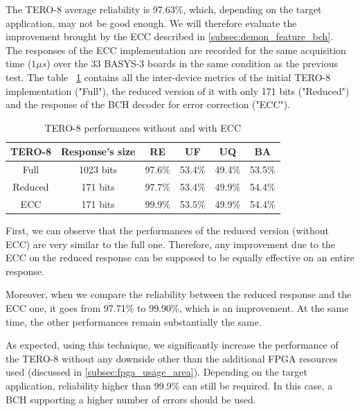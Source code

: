 The TERO-8 average reliability is 97.63\%, which, depending on the target application, may not be good enough. We will therefore evaluate the improvement brought by the ECC described in \ref{subsec:demon_feature_bch}.\\

The responses of the ECC implementation are recorded for the same acquisition time ($1\mu s$) over the 33 BASYS-3 boards in the same condition as the previous test. The table ~\ref{tab:raw_&_ecc_perf} contains all the inter-device metrics of the initial TERO-8 implementation ("Full"), the reduced version of it with only 171 bits ("Reduced") and the response of the BCH decoder for error correction ("ECC").

\begin{table}[H]  
  \centering
    \begin{tabular}{|c|c|c|c|c|c|}
        \hline
        \textbf{TERO-8} &  Response's size & RE & UF & UQ & BA\\
        \hline
        Full & 1023 bits & 97.6\% & 53.4\% & 49.4\% & 53.5\%\\
        \hline
        Reduced & 171 bits & 97.7\% & 53.4\% & 49.9\% & 54.4\%\\
        \hline
        ECC & 171 bits & 99.9\% & 53.5\% & 49.9\% & 54.4\%\\
        \hline
    \end{tabular}
   \caption{\label{tab:raw_&_ecc_perf}TERO-8 performances without and with ECC}
\end{table}

First, we can observe that the performances of the reduced version (without ECC) are very similar to the full one. Therefore, any improvement due to the ECC on the reduced response can be supposed to be equally effective on an entire response.

Moreover, when we compare the reliability between the reduced response and the ECC one, it goes from 97.71\% to 99.90\%, which is an improvement. At the same time, the other performances remain substantially the same.

As expected, using this technique, we significantly increase the performance of the TERO-8 without any downside other than the additional FPGA resources used (discussed in \ref{subsec:fpga_usage_area}). Depending on the target application, reliability higher than 99.9\% can still be required. In this case, a BCH supporting a higher number of errors should be used.\\

